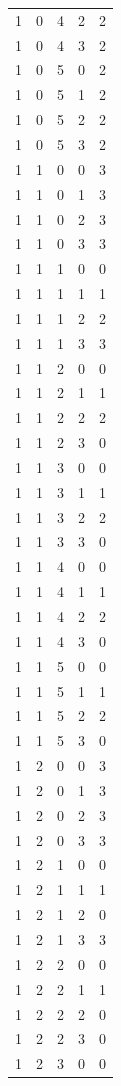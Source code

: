 \begin{longtable}{rrrrr}
1 & 0 & 4 & 2 & 2 \\
1 & 0 & 4 & 3 & 2 \\
1 & 0 & 5 & 0 & 2 \\
1 & 0 & 5 & 1 & 2 \\
1 & 0 & 5 & 2 & 2 \\
1 & 0 & 5 & 3 & 2 \\
1 & 1 & 0 & 0 & 3 \\
1 & 1 & 0 & 1 & 3 \\
1 & 1 & 0 & 2 & 3 \\
1 & 1 & 0 & 3 & 3 \\
1 & 1 & 1 & 0 & 0 \\
1 & 1 & 1 & 1 & 1 \\
1 & 1 & 1 & 2 & 2 \\
1 & 1 & 1 & 3 & 3 \\
1 & 1 & 2 & 0 & 0 \\
1 & 1 & 2 & 1 & 1 \\
1 & 1 & 2 & 2 & 2 \\
1 & 1 & 2 & 3 & 0 \\
1 & 1 & 3 & 0 & 0 \\
1 & 1 & 3 & 1 & 1 \\
1 & 1 & 3 & 2 & 2 \\
1 & 1 & 3 & 3 & 0 \\
1 & 1 & 4 & 0 & 0 \\
1 & 1 & 4 & 1 & 1 \\
1 & 1 & 4 & 2 & 2 \\
1 & 1 & 4 & 3 & 0 \\
1 & 1 & 5 & 0 & 0 \\
1 & 1 & 5 & 1 & 1 \\
1 & 1 & 5 & 2 & 2 \\
1 & 1 & 5 & 3 & 0 \\
1 & 2 & 0 & 0 & 3 \\
1 & 2 & 0 & 1 & 3 \\
1 & 2 & 0 & 2 & 3 \\
1 & 2 & 0 & 3 & 3 \\
1 & 2 & 1 & 0 & 0 \\
1 & 2 & 1 & 1 & 1 \\
1 & 2 & 1 & 2 & 0 \\
1 & 2 & 1 & 3 & 3 \\
1 & 2 & 2 & 0 & 0 \\
1 & 2 & 2 & 1 & 1 \\
1 & 2 & 2 & 2 & 0 \\
1 & 2 & 2 & 3 & 0 \\
1 & 2 & 3 & 0 & 0 \\

\end{longtable}
